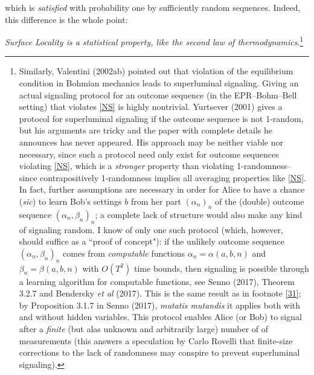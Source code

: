 \documentclass[11pt,a4paper]{article}
\numberwithin{equation}{section}
\newcommand{\er}{\eqref}
\newcommand{\al}{\alpha} \newcommand{\bt}{L\beta}
\begin{document}
 which is \emph{satisfied} with 
probability one by sufficiently random sequences. Indeed, this difference is the whole point:
\begin{center}
 \emph{Surface Locality is a statistical property, like the second law of thermodynamics}.\footnote{
Similarly, Valentini (2002ab)  pointed out that violation of  the equilibrium condition in Bohmian mechanics leads to superluminal signaling. Giving an actual signaling protocol for an outcome sequence  (in the EPR--Bohm--Bell setting) that violates \er{NS} is highly nontrivial. 
 Yurtsever (2001) gives a protocol for superluminal signaling if the outcome sequence is not 1-random, but his arguments are tricky and the paper with complete details he announces has never appeared.  His approach may  be neither viable nor necessary, since such a protocol need only exist for outcome sequences violating \er{NS}, which is a \emph{stronger} property than violating 1-randomness--since contrapositively 1-randomness implies all averaging properties like \er{NS}. In fact, further assumptions are necessary in order for Alice to have a chance (\emph{sic}) to learn Bob's settings $b$ from her part $(\al_n)_n$ of the (double) outcome sequence $(\al_n,\beta_n)_n$; a complete lack of structure would also make any kind of signaling random. I know of only one such protocol (which, however,  should  suffice as a ``proof of concept"): if the unlikely outcome sequence $(\al_n,\beta_n)_n$ comes from \emph{computable} functions $\al_n=\al(a,b,n)$ and $\beta_n=\beta(a,b,n)$ with $O(T^2)$ time bounds, then signaling is possible through a learning algorithm for computable functions, see Senno (2017), Theorem 3.2.7 and Bendersky \emph{et al} (2017). This is the same result as in footnote \ref{31}; by Proposition 3.1.7 in Senno (2017), \emph{mutatis mutandis} it applies both with and without hidden variables.
 This protocol enables Alice (or Bob) to signal after a \emph{finite} (but alas unknown and arbitrarily large) number of of measurements (this answers a speculation by
 Carlo Rovelli that  finite-size corrections to the lack of randomness may conspire to prevent superluminal signaling).
 }
\end{center}
 \appendix
\end{document}
